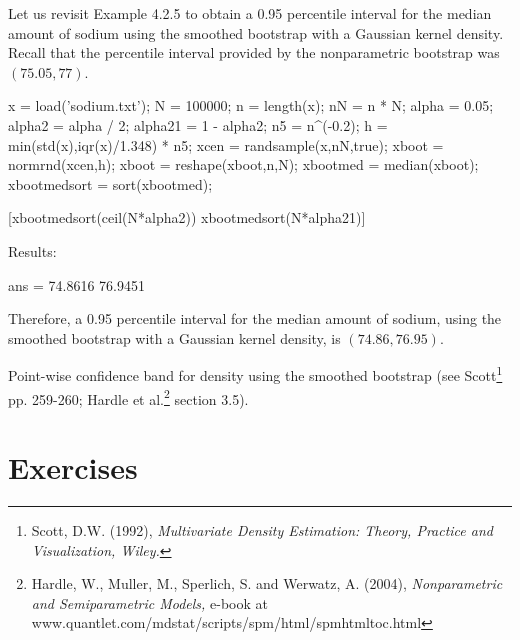 \begin{labwork}
Let us revisit Example 4.2.5 to obtain a 0.95 percentile interval for the median amount of sodium using the smoothed bootstrap with a Gaussian kernel density. Recall that the percentile interval provided by the nonparametric bootstrap was $(75.05, 77)$.

\begin{VrbM}
x = load('sodium.txt'); %
N = 100000; %
n = length(x); %
nN = n * N;
alpha = 0.05;
alpha2 = alpha / 2;
alpha21 = 1 - alpha2;
n5 = n^(-0.2);
h = min(std(x),iqr(x)/1.348) * n5; %
xcen = randsample(x,nN,true); %
xboot = normrnd(xcen,h); %
xboot = reshape(xboot,n,N); %
xbootmed = median(xboot); %
xbootmedsort = sort(xbootmed); %

[xbootmedsort(ceil(N*alpha2)) xbootmedsort(N*alpha21)]
\end{VrbM}
Results:
\begin{VrbM}
ans = 74.8616   76.9451
\end{VrbM}
Therefore, a 0.95 percentile interval for the median amount of sodium, using the smoothed bootstrap with a Gaussian kernel density, is $(74.86, 76.95)$.
\end{labwork}


Point-wise confidence band for density using the smoothed bootstrap (see Scott\footnote{Scott, D.W. (1992), {\it Multivariate Density Estimation: Theory, Practice and Visualization, Wiley.}} pp. 259-260; Hardle et al.\footnote{Hardle, W., Muller, M., Sperlich, S. and Werwatz, A. (2004), {\it Nonparametric and Semiparametric Models,} e-book at www.quantlet.com/mdstat/scripts/spm/html/spmhtmltoc.html}  section 3.5).

\section{Exercises}

